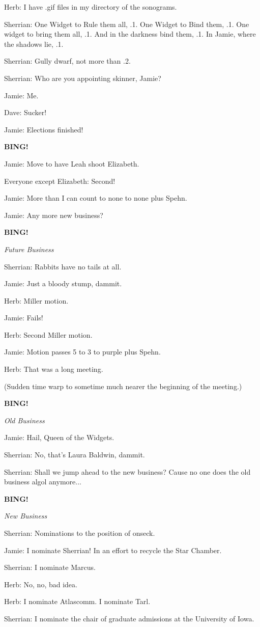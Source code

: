 \documentclass[12pt]{article}
\newcommand{\bing}{{\bf BING!} }
\newcommand{\goto}[1]{\bing \vskip 12pt \centerline{{\em{#1}}}}
\begin{document}
Herb: I have .gif files in my directory of the sonograms.

Sherrian: One Widget to Rule them all, .1. One Widget to Bind them, .1. One widget to bring them all, .1. And in the darkness bind them, .1. In Jamie, where the shadows lie, .1.

Sherrian: Gully dwarf, not more than .2.
	
Sherrian: Who are you appointing skinner, Jamie?

Jamie: Me.

Dave: Sucker!

Jamie: Elections finished!

\bing

Jamie: Move to have Leah shoot Elizabeth.

Everyone except Elizabeth: Second!

Jamie: More than I can count to none to none plus Spehn.

Jamie: Any more new business?

\goto{Future Business}

Sherrian: Rabbits have no tails at all.

Jamie: Just a bloody stump, dammit.

Herb: Miller motion.

Jamie: Fails!

Herb: Second Miller motion.

Jamie: Motion passes 5 to 3 to purple plus Spehn. 

Herb: That was a long meeting.

(Sudden time warp to sometime much nearer the beginning of the meeting.)

\goto{Old Business}

Jamie: Hail, Queen of the Widgets.

Sherrian: No, that's Laura Baldwin, dammit.

Sherrian: Shall we jump ahead to the new business? Cause no one does the old business algol anymore...

\goto{New Business}

Sherrian: Nominations to the position of onseck.

Jamie: I nominate Sherrian! In an effort to recycle the Star Chamber.

Sherrian: I nominate Marcus.

Herb: No, no, bad idea.

Herb: I nominate Atlascomm. I nominate Tarl.

Sherrian: I nominate the chair of graduate admissions at the University of Iowa.
\end{document}
